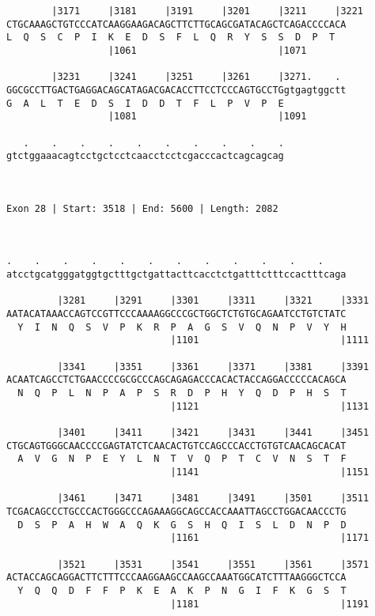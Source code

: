 \documentclass{article}
\begin{document}
{\begin{Verbatim}
        |3171     |3181     |3191     |3201     |3211     |3221
CTGCAAAGCTGTCCCATCAAGGAAGACAGCTTCTTGCAGCGATACAGCTCAGACCCCACA
L  Q  S  C  P  I  K  E  D  S  F  L  Q  R  Y  S  S  D  P  T  
                  |1061                         |1071       
  
        |3231     |3241     |3251     |3261     |3271.    . 
GGCGCCTTGACTGAGGACAGCATAGACGACACCTTCCTCCCAGTGCCTGgtgagtggctt
G  A  L  T  E  D  S  I  D  D  T  F  L  P  V  P  E           
                  |1081                         |1091       
  
   .    .    .    .    .    .    .    .    .    .
gtctggaaacagtcctgctcctcaacctcctcgacccactcagcagcag
                                                 
                                                 
 
Exon 28 | Start: 3518 | End: 5600 | Length: 2082



.    .    .    .    .    .    .    .    .    .    .    .    
atcctgcatgggatggtgctttgctgattacttcacctctgatttctttccactttcaga
                                                            
         |3281     |3291     |3301     |3311     |3321     |3331
AATACATAAACCAGTCCGTTCCCAAAAGGCCCGCTGGCTCTGTGCAGAATCCTGTCTATC
  Y  I  N  Q  S  V  P  K  R  P  A  G  S  V  Q  N  P  V  Y  H
                             |1101                         |1111
  
         |3341     |3351     |3361     |3371     |3381     |3391
ACAATCAGCCTCTGAACCCCGCGCCCAGCAGAGACCCACACTACCAGGACCCCCACAGCA
  N  Q  P  L  N  P  A  P  S  R  D  P  H  Y  Q  D  P  H  S  T
                             |1121                         |1131
  
         |3401     |3411     |3421     |3431     |3441     |3451
CTGCAGTGGGCAACCCCGAGTATCTCAACACTGTCCAGCCCACCTGTGTCAACAGCACAT
  A  V  G  N  P  E  Y  L  N  T  V  Q  P  T  C  V  N  S  T  F
                             |1141                         |1151
  
         |3461     |3471     |3481     |3491     |3501     |3511
TCGACAGCCCTGCCCACTGGGCCCAGAAAGGCAGCCACCAAATTAGCCTGGACAACCCTG
  D  S  P  A  H  W  A  Q  K  G  S  H  Q  I  S  L  D  N  P  D
                             |1161                         |1171
  
         |3521     |3531     |3541     |3551     |3561     |3571
ACTACCAGCAGGACTTCTTTCCCAAGGAAGCCAAGCCAAATGGCATCTTTAAGGGCTCCA
  Y  Q  Q  D  F  F  P  K  E  A  K  P  N  G  I  F  K  G  S  T
                             |1181                         |1191
  

\end{Verbatim}}
\end{document}
